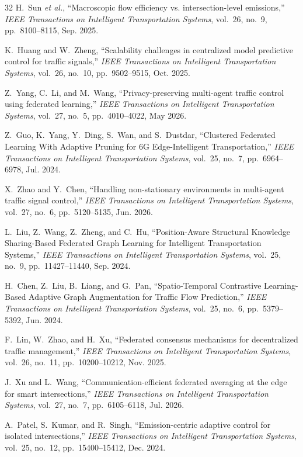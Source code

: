 \documentclass[journal]{IEEEtran}
\begin{document}
\begin{thebibliography}{32}
H.~Sun \textit{et al.}, ``Macroscopic flow efficiency vs. intersection-level emissions,'' \emph{IEEE Transactions on Intelligent Transportation Systems}, vol.~26, no.~9, pp.~8100--8115, Sep. 2025.

K.~Huang and W.~Zheng, ``Scalability challenges in centralized model predictive control for traffic signals,'' \emph{IEEE Transactions on Intelligent Transportation Systems}, vol.~26, no.~10, pp.~9502--9515, Oct. 2025.

Z.~Yang, C.~Li, and M.~Wang, ``Privacy-preserving multi-agent traffic control using federated learning,'' \emph{IEEE Transactions on Intelligent Transportation Systems}, vol.~27, no.~5, pp.~4010--4022, May 2026.

Z.~Guo, K.~Yang, Y.~Ding, S.~Wan, and S.~Dustdar, ``Clustered Federated Learning With Adaptive Pruning for 6G Edge-Intelligent Transportation,'' \emph{IEEE Transactions on Intelligent Transportation Systems}, vol.~25, no.~7, pp.~6964--6978, Jul. 2024.

X.~Zhao and Y.~Chen, ``Handling non-stationary environments in multi-agent traffic signal control,'' \emph{IEEE Transactions on Intelligent Transportation Systems}, vol.~27, no.~6, pp.~5120--5135, Jun. 2026.

L.~Liu, Z.~Wang, Z.~Zheng, and C.~Hu, ``Position-Aware Structural Knowledge Sharing-Based Federated Graph Learning for Intelligent Transportation Systems,'' \emph{IEEE Transactions on Intelligent Transportation Systems}, vol.~25, no.~9, pp.~11427--11440, Sep. 2024.

H.~Chen, Z.~Liu, B.~Liang, and G.~Pan, ``Spatio-Temporal Contrastive Learning-Based Adaptive Graph Augmentation for Traffic Flow Prediction,'' \emph{IEEE Transactions on Intelligent Transportation Systems}, vol.~25, no.~6, pp.~5379--5392, Jun. 2024.

F.~Lin, W.~Zhao, and H.~Xu, ``Federated consensus mechanisms for decentralized traffic management,'' \emph{IEEE Transactions on Intelligent Transportation Systems}, vol.~26, no.~11, pp.~10200--10212, Nov. 2025.

J.~Xu and L.~Wang, ``Communication-efficient federated averaging at the edge for smart intersections,'' \emph{IEEE Transactions on Intelligent Transportation Systems}, vol.~27, no.~7, pp.~6105--6118, Jul. 2026.

A.~Patel, S.~Kumar, and R.~Singh, ``Emission-centric adaptive control for isolated intersections,'' \emph{IEEE Transactions on Intelligent Transportation Systems}, vol.~25, no.~12, pp.~15400--15412, Dec. 2024.


\end{thebibliography}
\end{document}
